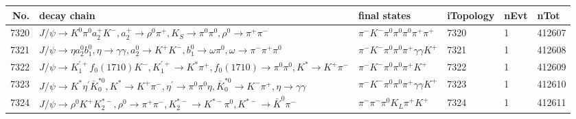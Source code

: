 \begin{table}[htbp] 
\begin{center}
\begin{small}
\begin{tabular}{rlllll}\hline\hline
 No. & decay chain & final states &  iTopology & nEvt & nTot \\\hline
7320&$J/\psi       \rightarrow K^{0}          \pi^{0}        a_{2}^{+}      K^{-}          , a_{2}^{+}       \rightarrow \rho^{0}      \pi^{+}        , K_{S}           \rightarrow \pi^{0}        \pi^{0}        , \rho^{0}       \rightarrow \pi^{+}        \pi^{-}        $&$\pi^{-}        K^{-}          \pi^{0}        \pi^{0}        \pi^{0}        \pi^{+}        \pi^{+}        $& 7320&    1&412607\\
7321&$J/\psi       \rightarrow \eta          a_{2}^{0}      b_{1}^{0}      , \eta           \rightarrow \gamma       \gamma       , a_{2}^{0}       \rightarrow K^{+}          K^{-}          , b_{1}^{0}       \rightarrow \omega         \pi^{0}        , \omega          \rightarrow \pi^{-}        \pi^{+}        \pi^{0}        $&$\pi^{-}        K^{-}          \pi^{0}        \pi^{0}        \pi^{+}        \gamma       \gamma       K^{+}          $& 7321&    1&412608\\
7322&$J/\psi       \rightarrow K_1^{'+}      f_{0}(1710)    K^{-}          , K_1^{'+}       \rightarrow K^{*}          \pi^{+}        , f_{0}(1710)     \rightarrow \pi^{0}        \pi^{0}        , K^{*}           \rightarrow K^{+}          \pi^{-}        $&$\pi^{-}        K^{-}          \pi^{0}        \pi^{0}        \pi^{+}        K^{+}          $& 7322&    1&412609\\
7323&$J/\psi       \rightarrow K^{*}          \eta^{\prime} \bar{K}_0^{*0}, K^{*}           \rightarrow K^{+}          \pi^{-}        , \eta^{\prime}  \rightarrow \pi^{0}        \pi^{0}        \eta          , \bar{K}_0^{*0} \rightarrow K^{-}          \pi^{+}        , \eta           \rightarrow \gamma       \gamma       $&$\pi^{-}        K^{-}          \pi^{0}        \pi^{0}        \pi^{+}        \gamma       \gamma       K^{+}          $& 7323&    1&412610\\
7324&$J/\psi       \rightarrow \rho^{0}      K^{+}          K_2^{*-}       , \rho^{0}       \rightarrow \pi^{+}        \pi^{-}        , K_2^{*-}        \rightarrow K^{*-}         \pi^{0}        , K^{*-}          \rightarrow \bar{K}^{0}   \pi^{-}        $&$\pi^{-}        \pi^{-}        \pi^{0}        K_{L}          \pi^{+}        K^{+}          $& 7324&    1&412611\\

\end{tabular}
\end{small}
\end{center}
\end{table}
